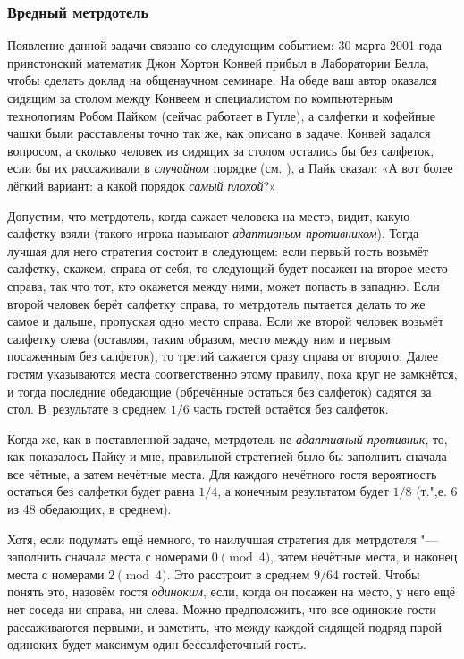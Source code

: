 \documentclass[twoside]{book}
\begin{document}
\subsubsection*{Вредный метрдотель}%

Появление данной задачи связано со следующим событием:
30 марта 2001 года принстонский математик Джон Хортон Конвей %
прибыл в Лаборатории Белла, %
чтобы сделать доклад на общенаучном семинаре. %
На обеде ваш автор оказался сидящим за столом между Конвеем и специалистом по компьютерным технологиям Робом Пайком %
(сейчас работает в Гугле), а салфетки и кофейные чашки были расставлены точно так же, как описано в задаче.
Конвей задался вопросом, а сколько человек из
сидящих за столом остались бы без салфеток, если бы их рассаживали в \emph{случайном} порядке (см. ), а Пайк сказал: «А вот более лёгкий вариант: а какой порядок \emph{самый плохой}?»

\bigskip

Допустим, что метрдотель, когда сажает человека на место, видит, какую салфетку взяли (такого игрока называют \emph{адаптивным противником}). %
Тогда лучшая для него стратегия состоит в следующем:
если первый гость возьмёт салфетку, скажем, справа от себя, то следующий будет посажен на второе место справа, так что тот, кто окажется между ними, может попасть в западню.
Если второй человек берёт салфетку справа, то метрдотель пытается делать то же самое и дальше, пропуская одно место справа.
Если же второй человек возьмёт салфетку слева (оставляя, таким образом, место между ним и первым посаженным без салфеток), то третий сажается сразу справа от второго.
Далее гостям указываются места соответственно этому правилу, пока круг не замкнётся, и тогда последние обедающие (обречённые остаться без салфеток) садятся за стол.
В~результате в среднем $1/6$ часть гостей остаётся без салфеток.

Когда же, как в поставленной задаче, метрдотель не \emph{адаптивный противник}, то, как показалось Пайку и мне, правильной стратегией было бы заполнить сначала все чётные, а затем нечётные места.
Для каждого нечётного гостя вероятность остаться без салфетки будет равна $1/4$, %
а конечным результатом будет $1/8$ (т.",е. 6 из 48 обедающих, в среднем).

Хотя, если подумать ещё немного, то наилучшая стратегия для метрдотеля "--- заполнить сначала места с номерами $0\pmod4$, затем нечётные места, и наконец места с номерами $2\pmod4$.
Это расстроит в среднем $9/64$ гостей.
Чтобы понять это, назовём гостя \emph{одиноким}, если, когда он посажен на место, у него ещё нет соседа ни справа, ни слева.
Можно предположить, что все одинокие гости рассаживаются первыми, и заметить, что между каждой сидящей подряд парой одиноких будет максимум один бессалфеточный гость.
\end{document}
